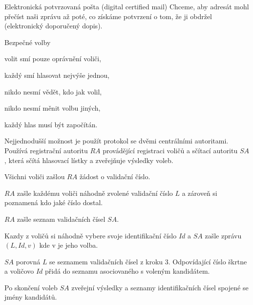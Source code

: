 \begin{obecne}{Elektronická potvrzovaná pošta (digital certified mail)}
  Chceme, aby adresát mohl přečíst naši zprávu až poté, co získáme potvrzení o
  tom, že ji obdržel (elektronický doporučený dopis).
\end{obecne}

\begin{obecne}{Bezpečné volby}
  \begin{pitemize}
    \item volit smí pouze oprávnění voliči,
    \item každý smí hlasovat nejvýše jednou,
    \item nikdo nesmí vědět, kdo jak volil,
    \item nikdo nesmí měnit volbu jiných,
    \item každý hlas musí být započítán.
  \end{pitemize}

  Nejjednodušší možnost je použít protokol se dvěmi centrálními autoritami.
  Používá registrační autoritu $RA$ provádějící registraci voličů a sčítací
  autoritu $SA$, která sčítá hlasovací lístky a zveřejňuje výsledky voleb.
  \begin{penumerate}
    \item Všichni voliči zašlou $RA$ žádost o validační číslo.
    \item $RA$ zašle každému voliči náhodně zvolené validační číslo $L$ a zároveň
    si poznamená kdo jaké číslo dostal.
    \item $RA$ zašle seznam validačních čísel $SA$.
    \item Kazdy z voličů si náhodně vybere svoje identifikační číslo $Id$ a $SA$
    zašle zprávu $(L, Id, v)$ kde v je jeho volba.
    \item $SA$ porovná $L$ se seznamem validačních čísel z kroku 3. Odpovídající
    číslo škrtne a voličovo $Id$ přidá do seznamu asociovaného s voleným kandidátem.
    \item Po skončení voleb $SA$ zveřejní výsledky a seznamy identifikačních čísel
    spojené se jmény kandidátů.
  \end{penumerate}
\end{obecne}

